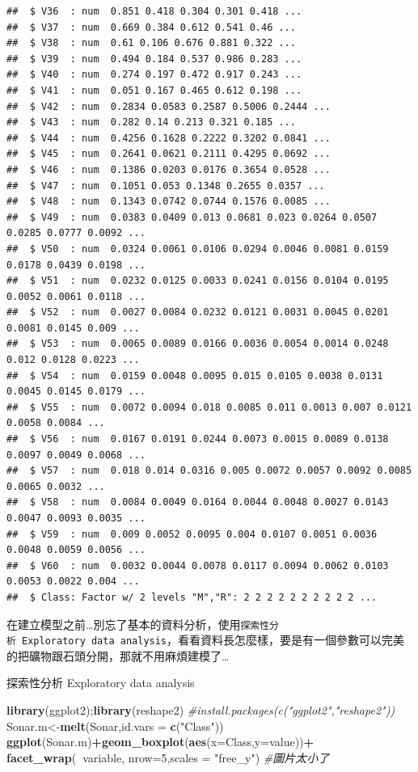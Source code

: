 \documentclass[]{book}
\newenvironment{Shaded}{\begin{snugshade}}{\end{snugshade}}
\newcommand{\CommentTok}[1]{\textcolor[rgb]{0.56,0.35,0.01}{\textit{#1}}}
\newcommand{\DataTypeTok}[1]{\textcolor[rgb]{0.13,0.29,0.53}{#1}}
\newcommand{\DecValTok}[1]{\textcolor[rgb]{0.00,0.00,0.81}{#1}}
\newcommand{\KeywordTok}[1]{\textcolor[rgb]{0.13,0.29,0.53}{\textbf{#1}}}
\newcommand{\NormalTok}[1]{#1}
\newcommand{\OperatorTok}[1]{\textcolor[rgb]{0.81,0.36,0.00}{\textbf{#1}}}
\newcommand{\StringTok}[1]{\textcolor[rgb]{0.31,0.60,0.02}{#1}}
\begin{document}
\begin{verbatim}
##  $ V36  : num  0.851 0.418 0.304 0.301 0.418 ...
##  $ V37  : num  0.669 0.384 0.612 0.541 0.46 ...
##  $ V38  : num  0.61 0.106 0.676 0.881 0.322 ...
##  $ V39  : num  0.494 0.184 0.537 0.986 0.283 ...
##  $ V40  : num  0.274 0.197 0.472 0.917 0.243 ...
##  $ V41  : num  0.051 0.167 0.465 0.612 0.198 ...
##  $ V42  : num  0.2834 0.0583 0.2587 0.5006 0.2444 ...
##  $ V43  : num  0.282 0.14 0.213 0.321 0.185 ...
##  $ V44  : num  0.4256 0.1628 0.2222 0.3202 0.0841 ...
##  $ V45  : num  0.2641 0.0621 0.2111 0.4295 0.0692 ...
##  $ V46  : num  0.1386 0.0203 0.0176 0.3654 0.0528 ...
##  $ V47  : num  0.1051 0.053 0.1348 0.2655 0.0357 ...
##  $ V48  : num  0.1343 0.0742 0.0744 0.1576 0.0085 ...
##  $ V49  : num  0.0383 0.0409 0.013 0.0681 0.023 0.0264 0.0507 0.0285 0.0777 0.0092 ...
##  $ V50  : num  0.0324 0.0061 0.0106 0.0294 0.0046 0.0081 0.0159 0.0178 0.0439 0.0198 ...
##  $ V51  : num  0.0232 0.0125 0.0033 0.0241 0.0156 0.0104 0.0195 0.0052 0.0061 0.0118 ...
##  $ V52  : num  0.0027 0.0084 0.0232 0.0121 0.0031 0.0045 0.0201 0.0081 0.0145 0.009 ...
##  $ V53  : num  0.0065 0.0089 0.0166 0.0036 0.0054 0.0014 0.0248 0.012 0.0128 0.0223 ...
##  $ V54  : num  0.0159 0.0048 0.0095 0.015 0.0105 0.0038 0.0131 0.0045 0.0145 0.0179 ...
##  $ V55  : num  0.0072 0.0094 0.018 0.0085 0.011 0.0013 0.007 0.0121 0.0058 0.0084 ...
##  $ V56  : num  0.0167 0.0191 0.0244 0.0073 0.0015 0.0089 0.0138 0.0097 0.0049 0.0068 ...
##  $ V57  : num  0.018 0.014 0.0316 0.005 0.0072 0.0057 0.0092 0.0085 0.0065 0.0032 ...
##  $ V58  : num  0.0084 0.0049 0.0164 0.0044 0.0048 0.0027 0.0143 0.0047 0.0093 0.0035 ...
##  $ V59  : num  0.009 0.0052 0.0095 0.004 0.0107 0.0051 0.0036 0.0048 0.0059 0.0056 ...
##  $ V60  : num  0.0032 0.0044 0.0078 0.0117 0.0094 0.0062 0.0103 0.0053 0.0022 0.004 ...
##  $ Class: Factor w/ 2 levels "M","R": 2 2 2 2 2 2 2 2 2 2 ...
\end{verbatim}

在建立模型之前\ldots 別忘了基本的資料分析，使用\texttt{探索性分析\ Exploratory\ data\ analysis}，看看資料長怎麼樣，要是有一個參數可以完美的把礦物跟石頭分開，那就不用麻煩建模了\ldots{}

探索性分析 Exploratory data analysis

\begin{Shaded}
\begin{Highlighting}[]
\KeywordTok{library}\NormalTok{(ggplot2);}\KeywordTok{library}\NormalTok{(reshape2) }\CommentTok{#install.packages(c("ggplot2","reshape2"))}
\NormalTok{Sonar.m<-}\KeywordTok{melt}\NormalTok{(Sonar,}\DataTypeTok{id.vars =} \KeywordTok{c}\NormalTok{(}\StringTok{"Class"}\NormalTok{))}
\KeywordTok{ggplot}\NormalTok{(Sonar.m)}\OperatorTok{+}\KeywordTok{geom_boxplot}\NormalTok{(}\KeywordTok{aes}\NormalTok{(}\DataTypeTok{x=}\NormalTok{Class,}\DataTypeTok{y=}\NormalTok{value))}\OperatorTok{+}
\StringTok{    }\KeywordTok{facet_wrap}\NormalTok{(}\OperatorTok{~}\NormalTok{variable, }\DataTypeTok{nrow=}\DecValTok{5}\NormalTok{,}\DataTypeTok{scales =} \StringTok{"free_y"}\NormalTok{) }\CommentTok{#圖片太小了}
\end{Highlighting}
\end{Shaded}
\end{document}
